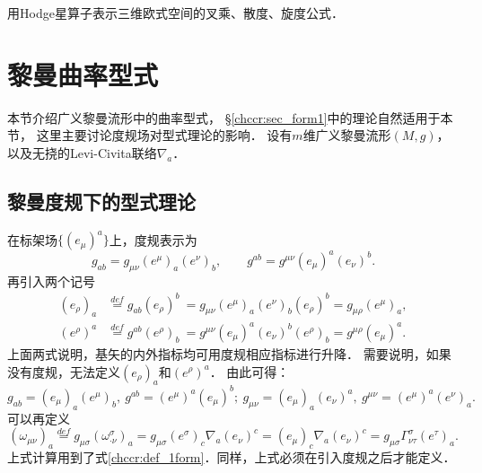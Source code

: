 \begin{exercise}
	用Hodge星算子表示三维欧式空间的叉乘、散度、旋度公式．
\end{exercise}




\section{黎曼曲率型式}\label{chrg:sec_form2}
本节介绍广义黎曼流形中的曲率型式\cite[\S 1.7]{chandrasekhar-1983}，
\S\ref{chccr:sec_form1}中的理论自然适用于本节，
这里主要讨论度规场对型式理论的影响．
设有$m$维广义黎曼流形$(M,g)$，以及无挠的Levi-Civita联络$\nabla_a$．


\subsection{黎曼度规下的型式理论}
在标架场$\{(e_\mu)^a\}$上，度规表示为
\begin{equation}
g_{ab}=g_{\mu\nu}(e^\mu)_a (e^\nu)_b, \qquad
g^{ab}=g^{\mu\nu}(e_\mu)^a (e_\nu)^b.
\end{equation}
再引入两个记号
\begin{align}
(e_\rho)_a &\overset{def}{=} g_{ab}(e_\rho)^b \
= g_{\mu\nu}(e^\mu)_a (e^\nu)_b (e_\rho)^b
= g_{\mu\rho}(e^\mu)_a, \\
(e^\rho)^a &\overset{def}{=} g^{ab}(e^\rho)_b \
= g^{\mu\nu}(e_\mu)^a (e_\nu)^b(e^\rho)_b
= g^{\mu\rho}(e_\mu)^a .
\end{align}
上面两式说明，基矢的内外指标均可用度规相应指标进行升降．
需要说明，如果没有度规，无法定义$(e_\rho)_a$和$(e^\rho)^a$．
由此可得：
\begin{equation}
  g_{ab}=(e_\mu)_a (e^\mu)_b, \  g^{ab}=(e^\mu)^a (e_\mu)^b ; \
  g_{\mu\nu}=(e_\mu)_a (e_\nu)^a, \  g^{\mu\nu}=(e^\mu)^a (e^\nu)_a .
\end{equation}
可以再定义
\begin{equation}
    (\omega _{\mu\nu})_{a} \overset{def}{=}
      g_{\mu\sigma} (\omega ^{\sigma}_{\cdot\nu})_{a}
    = g_{\mu\sigma} (e^\sigma)_c \nabla _a (e_\nu)^c
    = (e_\mu)_c \nabla _a (e_\nu)^c
    = g_{\mu\sigma}\Gamma^{\sigma}_{\nu\tau} (e^\tau)_a .
\end{equation}
上式计算用到了式\eqref{chccr:def_1form}．同样，上式必须在引入度规之后才能定义．

